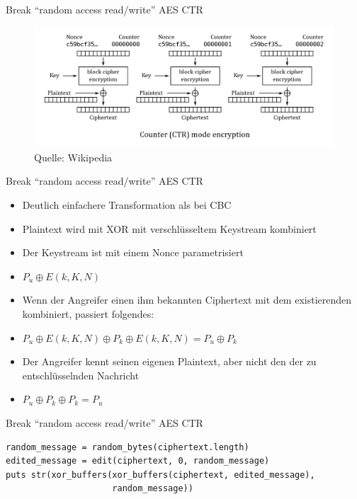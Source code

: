 \documentclass[presentation]{beamer}
\begin{document}
\begin{frame}[label={sec:org519b225}]{Break “random access read/write” AES CTR}
\begin{figure}[htbp]
\centering
\includegraphics[width=.9\linewidth]{./img/ctr_encryption.png}
\caption{Quelle: Wikipedia}
\end{figure}
\end{frame}

\begin{frame}[label={sec:org1b30ceb}]{Break “random access read/write” AES CTR}
\begin{itemize}
\item Deutlich einfachere Transformation als bei CBC
\item Plaintext wird mit XOR mit verschlüsseltem Keystream kombiniert
\item Der Keystream ist mit einem Nonce parametrisiert
\item \(P_u \oplus E(k, K, N)\)
\item Wenn der Angreifer einen ihm bekannten Ciphertext mit dem
existierenden kombiniert, passiert folgendes:
\item \(P_u \oplus E(k, K, N) \oplus P_k \oplus E(k, K, N) = P_u \oplus P_k\)
\item Der Angreifer kennt seinen eigenen Plaintext, aber nicht den der
zu entschlüsselnden Nachricht
\item \(P_u \oplus P_k \oplus P_k = P_u\)
\end{itemize}
\end{frame}

\begin{frame}[fragile,label={sec:orgfff157f}]{Break “random access read/write” AES CTR}
 \begin{verbatim}
random_message = random_bytes(ciphertext.length)
edited_message = edit(ciphertext, 0, random_message)
puts str(xor_buffers(xor_buffers(ciphertext, edited_message),
                     random_message))
\end{verbatim}
\end{frame}
\end{document}
